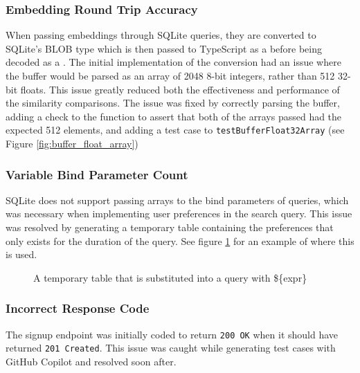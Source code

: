 \subsubsection{Embedding Round Trip Accuracy}\label{sec:embedding_round_trip}
When passing embeddings through SQLite queries, they are converted to SQLite's BLOB type which is then passed to TypeScript as a 
before being decoded as a .
The initial implementation of the conversion had an issue where the buffer would be parsed as an array of 2048 8-bit integers,
rather than 512 32-bit floats. This issue greatly reduced both the effectiveness and performance of the similarity comparisons.
The issue was fixed by correctly parsing the buffer, adding a check to the  function to assert
that both of the arrays passed had the expected 512 elements, and adding a test case to
\texttt{testBufferFloat32Array} (see Figure \ref{fig:buffer_float_array})

\subsubsection{Variable Bind Parameter Count}
SQLite does not support passing arrays to the bind parameters of queries, which was
necessary when implementing user preferences in the search query. This issue
was resolved by generating a temporary table containing the preferences
that only exists for the duration of the query. See figure \ref{fig:temp_table_substitution}
for an example of where this is used.

\begin{figure}[h]
    \caption{\label{fig:temp_table_substitution}A temporary table that is substituted into a query with \$\{expr\}}
    \raggedright

\end{figure}

\subsubsection{Incorrect Response Code}
The signup endpoint was initially coded to return \texttt{200 OK} when it should have returned
\texttt{201 Created}. This issue was caught while generating test cases with GitHub Copilot and resolved
soon after.


